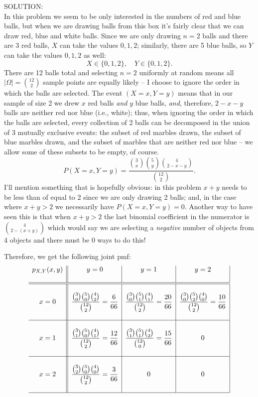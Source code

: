 \documentclass[12pt]{article}
\begin{document}
\noindent SOLUTION:\\
In this problem we seem to be only interested in the numbers of red and blue balls,
but when we are drawing balls from this box it's fairly clear that we can draw red,
blue and white balls.  Since we are only drawing $n=2$ balls and there are 3 red balls,
$X$ can take the values $0,1,2$; similarly, there are 5 blue balls, so $Y$ can take the values $0,1,2$ as well:
$$X\in \{0,1,2\},\quad Y\in\{0,1,2\}.$$
There are 12 balls total and selecting $n=2$ uniformly at random means all $|\Omega|={12\choose 2}$ sample points are equally likely -- I choose to ignore the order in which the balls are selected.
The event $(X=x,Y=y)$ means that in our sample of size 2 we drew $x$ red balls {\em and} $y$ blue balls, {\em and}, therefore, $2-x-y$ balls are
neither red nor blue (i.e., white); thus,
when ignoring the order in which the balls are selected,
every collection of 2 balls can be decomposed in the union of 3 mutually exclusive events:
the subset of red marbles drawn, the subset of blue marbles drawn, and the subset of marbles that are neither red nor blue -- we allow some of these
subsets to be empty, of course.
$$P(X=x,Y=y) = \dfrac {{3\choose x}{5\choose y}{4\choose 2-x-y}}{{12\choose 2}}.$$
\noindent I'll mention something that is hopefully obvious: in this problem $x+y$ needs to be less than of equal to 2 since we are only drawing 2 balls; and,
in the case where $x+y>2$ we necessarily have $P(X=x,Y=y)=0$.  Another way to have seen this is that when $x+y>2$ the last binomial coefficient in the numerator is ${4\choose 2-(x+y)}$ which would say we are selecting a {\em negative} number of objects from 4 objects and there must be 0 ways to do this!\medskip

\noindent Therefore, we get the following joint pmf:
$$\begin{array}{c||c|c|c|} p_{X,Y}(x,y)  & y=0 & y=1 & y=2 \\
& & & \\ \hline\hline
& & & \\
x=0 & \dfrac {{3\choose 0}{5\choose 0}{4\choose 2}}{{12\choose 2}}=\dfrac {6}{66} & \dfrac {{3\choose 0}{5\choose 1}{4\choose 1}}{{12\choose 2}}= \dfrac {20}{66}& \dfrac {{3\choose 0}{5\choose 2}{4\choose 0}}{{12\choose 2}}= \dfrac {10}{66}\\
& & & \\ \hline
& & & \\
x=1 & \dfrac {{3\choose 1}{5\choose 0}{4\choose 1}}{{12\choose 2}}= \dfrac {12}{66}& \dfrac {{3\choose 1}{5\choose 1}{4\choose 2}}{{12\choose 0}}= \dfrac {15}{66}& 0\\
& & & \\ \hline
& & & \\
x=2 & \dfrac {{3\choose 2}{5\choose 0}{4\choose 0}}{{12\choose 2}}= \dfrac {3}{66}& 0 & 0 \\
& & & \\ \hline \end{array}$$
\end{document}
